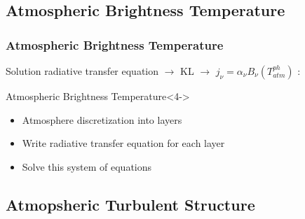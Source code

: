 \documentclass[10pt,aspectratio=169]{beamer}
\begin{document}
\subsection{Atmospheric Brightness Temperature}

\begin{frame}
\frametitle{Atmospheric Brightness Temperature}

Solution radiative transfer equation $\rightarrow$ KL $\rightarrow$ $j_\nu = \alpha_\nu B_\nu(T_{atm}^{ph})$ :



\begin{block}{Atmospheric Brightness Temperature}<4->
%
%
\end{block}

\begin{itemize}
\item<7-> Atmosphere discretization into \alert{layers}
\item<8-> Write radiative transfer equation for each layer 
\item<9-> Solve this system of equations
\end{itemize}

\end{frame}

\subsection{Atmopsheric Turbulent Structure}
\end{document}
